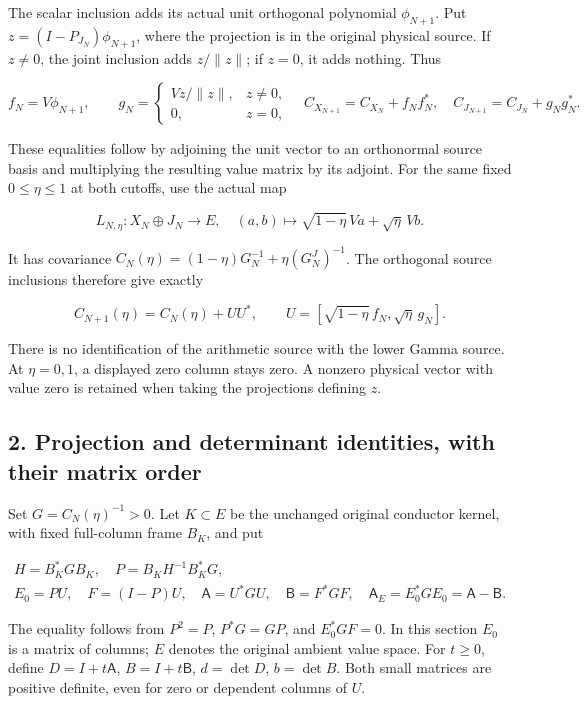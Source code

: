 \documentclass[11pt]{article}
\begin{document}
The scalar inclusion adds its actual unit orthogonal polynomial \(\phi_{N+1}\). Put \(z=(I-P_{J_N})\phi_{N+1}\), where the projection is in the original physical source. If \(z\ne0\), the joint inclusion adds \(z/\|z\|\); if \(z=0\), it adds nothing. Thus

\[
f_N=V\phi_{N+1},\qquad
g_N=\begin{cases}Vz/\|z\|,&z\ne0,\\0,&z=0,\end{cases}
\quad
C_{X_{N+1}}=C_{X_N}+f_Nf_N^*,\quad
C_{J_{N+1}}=C_{J_N}+g_Ng_N^* .\tag{ACD1}
\]

These equalities follow by adjoining the unit vector to an orthonormal source basis and multiplying the resulting value matrix by its adjoint. For the same fixed \(0\le\eta\le1\) at both cutoffs, use the actual map

\[
L_{N,\eta}:X_N\oplus J_N\longrightarrow E,
\quad (a,b)\longmapsto\sqrt{1-\eta}\,V a+\sqrt\eta\,V b.
\]

It has covariance \(C_N(\eta)=(1-\eta)G_N^{-1}+\eta(G_N^J)^{-1}\). The orthogonal source inclusions therefore give exactly

\[
C_{N+1}(\eta)=C_N(\eta)+UU^*,\qquad
U=[\sqrt{1-\eta}\,f_N,\sqrt\eta\,g_N].\tag{ACD2}
\]

There is no identification of the arithmetic source with the lower Gamma source. At \(\eta=0,1\), a displayed zero column stays zero. A nonzero physical vector with value zero is retained when taking the projections defining \(z\).

\subsection{2. Projection and determinant identities, with their matrix order}\label{projection-and-determinant-identities-with-their-matrix-order}

Set \(G=C_N(\eta)^{-1}>0\). Let \(K\subset E\) be the unchanged original conductor kernel, with fixed full-column frame \(B_K\), and put

\[
\begin{gathered}H=B_K^*GB_K,\quad P=B_KH^{-1}B_K^*G,\\
E_0=PU,\quad F=(I-P)U,\quad
\mathsf A=U^*GU,\quad\mathsf B=F^*GF,\quad
\mathsf A_E=E_0^*GE_0=\mathsf A-\mathsf B .\end{gathered}\tag{ACD3}
\]

The equality follows from \(P^2=P\), \(P^*G=GP\), and \(E_0^*GF=0\). In this section \(E_0\) is a matrix of columns; \(E\) denotes the original ambient value space. For \(t\ge0\), define \(D=I+t\mathsf A\), \(B=I+t\mathsf B\), \(d=\det D\), \(b=\det B\). Both small matrices are positive definite, even for zero or dependent columns of \(U\).
\end{document}
